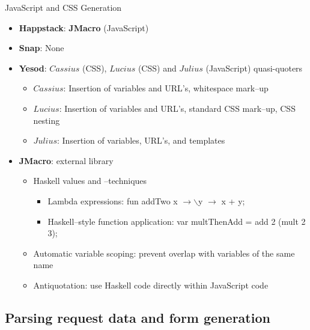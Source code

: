 \documentclass[10pt,usenames,dvipsnames]{beamer}
\begin{document}
	\begin{frame}{JavaScript and CSS Generation}
		\begin{itemize}
		\item \textbf{Happstack}: \textbf{JMacro} (JavaScript)
		\item\textbf{Snap}: None
		\item \textbf{Yesod}: $ Cassius $ (CSS), $ Lucius $ (CSS) and $ Julius $ (JavaScript) quasi-quoters
		\begin{itemize}
			\item $ Cassius $: Insertion of variables and URL's, whitespace mark--up
			\item $ Lucius $: Insertion of variables and URL's, standard CSS mark--up, CSS nesting
			\item $ Julius $: Insertion of variables, URL's, and templates
		\end{itemize}
		\end{itemize}

		\begin{itemize}
		\item \textbf{JMacro}: external library
		\begin{itemize}
			\item Haskell values and --techniques
			\begin{itemize}
				\item Lambda expressions: fun addTwo x $ \rightarrow \backslash $y $ \rightarrow $ x + y;  
				\item Haskell--style function application: var multThenAdd = add 2 (mult 2 3);
			\end{itemize}
			\item Automatic variable scoping: prevent overlap with variables of the same name
			\item Antiquotation: use Haskell code directly within JavaScript code
		\end{itemize}
		\end{itemize}
	\end{frame}	
	
	\subsection*{Parsing request data and form generation}
	
\end{document}
